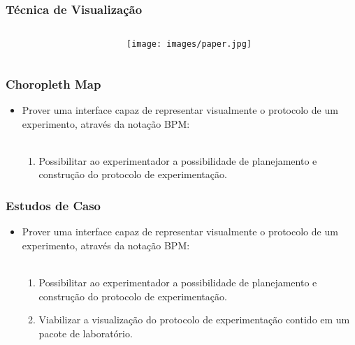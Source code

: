 \documentclass[aspectratio=169]{beamer}
\begin{document}
\begin{frame}
\frametitle{Técnica de Visualização}
\justifying

\begin{columns}

\begin{column}{0.5\textwidth}


\end{column}

\begin{column}{0.5\textwidth}

\begin{figure}
\centering
\texttt{[image: images/paper.jpg]}
\end{figure}


\end{column}
\end{columns}


\end{frame}

\begin{frame}
\frametitle{Choropleth Map}
\justifying

\begin{itemize}
\item Prover uma interface capaz de representar visualmente o protocolo de um experimento, através da notação BPM:
\\~\\
\begin{enumerate}
\item Possibilitar ao experimentador a possibilidade de planejamento e construção do protocolo de experimentação.
\end{enumerate}
\end{itemize}
\end{frame}

\begin{frame}
\frametitle{Estudos de Caso}
\justifying

\begin{itemize}
\item Prover uma interface capaz de representar visualmente o protocolo de um experimento, através da notação BPM:
\\~\\
\begin{enumerate}
\item Possibilitar ao experimentador a possibilidade de planejamento e construção do protocolo de experimentação.
\item Viabilizar a visualização do protocolo de experimentação contido em um pacote de laboratório.
\end{enumerate}
\end{itemize}
\end{frame}
\end{document}
